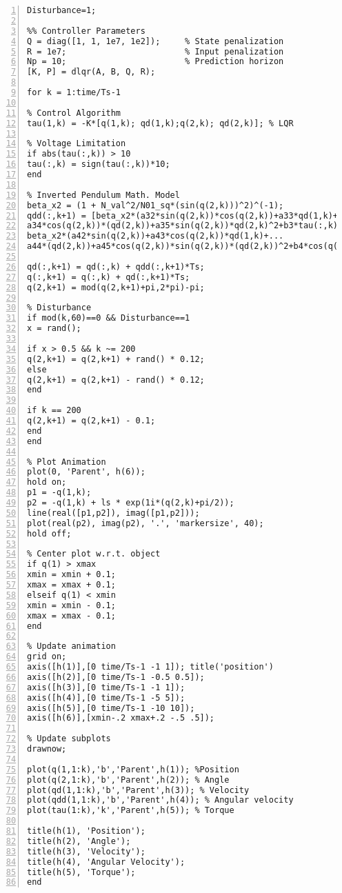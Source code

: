 \begin{lstlisting}[numbers=left,basicstyle=\scriptsize,caption={Source code of linear quadratic regulator (Simulation).},captionpos=b]
Disturbance=1;

%% Controller Parameters
Q = diag([1, 1, 1e7, 1e2]);     % State penalization 
R = 1e7;                        % Input penalization
Np = 10;                        % Prediction horizon 
[K, P] = dlqr(A, B, Q, R);

for k = 1:time/Ts-1

% Control Algorithm
tau(1,k) = -K*[q(1,k); qd(1,k);q(2,k); qd(2,k)]; % LQR

% Voltage Limitation
if abs(tau(:,k)) > 10
tau(:,k) = sign(tau(:,k))*10;
end

% Inverted Pendulum Math. Model 
beta_x2 = (1 + N_val^2/N01_sq*(sin(q(2,k)))^2)^(-1);
qdd(:,k+1) = [beta_x2*(a32*sin(q(2,k))*cos(q(2,k))+a33*qd(1,k)+...
a34*cos(q(2,k))*(qd(2,k))+a35*sin(q(2,k))*qd(2,k)^2+b3*tau(:,k));
beta_x2*(a42*sin(q(2,k))+a43*cos(q(2,k))*qd(1,k)+...
a44*(qd(2,k))+a45*cos(q(2,k))*sin(q(2,k))*(qd(2,k))^2+b4*cos(q(2,k))*tau(:,k))];

qd(:,k+1) = qd(:,k) + qdd(:,k+1)*Ts;        
q(:,k+1) = q(:,k) + qd(:,k+1)*Ts;
q(2,k+1) = mod(q(2,k+1)+pi,2*pi)-pi;

% Disturbance
if mod(k,60)==0 && Disturbance==1
x = rand();

if x > 0.5 && k ~= 200
q(2,k+1) = q(2,k+1) + rand() * 0.12; 
else
q(2,k+1) = q(2,k+1) - rand() * 0.12; 
end

if k == 200
q(2,k+1) = q(2,k+1) - 0.1;  
end
end

% Plot Animation
plot(0, 'Parent', h(6));
hold on;
p1 = -q(1,k);
p2 = -q(1,k) + ls * exp(1i*(q(2,k)+pi/2));
line(real([p1,p2]), imag([p1,p2]));
plot(real(p2), imag(p2), '.', 'markersize', 40);
hold off;

% Center plot w.r.t. object
if q(1) > xmax
xmin = xmin + 0.1;
xmax = xmax + 0.1;
elseif q(1) < xmin
xmin = xmin - 0.1;
xmax = xmax - 0.1;
end

% Update animation
grid on;
axis([h(1)],[0 time/Ts-1 -1 1]); title('position')
axis([h(2)],[0 time/Ts-1 -0.5 0.5]); 
axis([h(3)],[0 time/Ts-1 -1 1]); 
axis([h(4)],[0 time/Ts-1 -5 5]); 
axis([h(5)],[0 time/Ts-1 -10 10]); 
axis([h(6)],[xmin-.2 xmax+.2 -.5 .5]);

% Update subplots
drawnow;

plot(q(1,1:k),'b','Parent',h(1)); %Position 
plot(q(2,1:k),'b','Parent',h(2)); % Angle 
plot(qd(1,1:k),'b','Parent',h(3)); % Velocity
plot(qdd(1,1:k),'b','Parent',h(4)); % Angular velocity
plot(tau(1:k),'k','Parent',h(5)); % Torque

title(h(1), 'Position');
title(h(2), 'Angle');
title(h(3), 'Velocity');
title(h(4), 'Angular Velocity');
title(h(5), 'Torque');
end
\end{lstlisting}